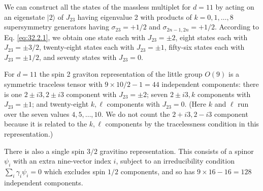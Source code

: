 We can construct all the states of the massless multiplet for \(d=11\)
by acting on an eigenstate \(\lvert2\rangle\) of \(J_{23}\) having
eigenvalue 2 with products of \(k=0,1,\ldots,8\) supersymmetry generators
having \(\sigma_{23}=+1/2\) and \(\sigma_{2n-1,2n}=+1/2\). According to
Eq. \eqref{eq:32.2.1}, we obtain one state each with \(J_{23}=\pm2\),
eight states each with \(J_{23}=\pm3/2\), twenty-eight states each with
\(J_{23}=\pm1\), fifty-six states each with \(J_{23}=\pm1/2\), and
seventy states with \(J_{23}=0\).

For \(d=11\) the spin 2 graviton representation of the little group
\(O(9)\) is a symmetric traceless tensor with
\(9\times10/2-1=44\) independent components: there is one
\(2\mathbin{\pm}i3,2\mathbin{\pm}i3\) component with
\(J_{23}=\pm2\); seven \(2\mathbin{\pm}i3,k\) components with
\(J_{23}=\pm1\); and twenty-eight \(k,\ell\) components with
\(J_{23}=0\). (Here \(k\) and \(\ell\) run over the seven values
\(4,5,\ldots,10\). We do not count the
\(2+i3,2-i3\) component because it is related to the \(k,\ell\)
components by the tracelessness condition in this representation.)

There is also a single spin \(3/2\) gravitino representation. This
consists of a spinor \(\psi_i\) with an extra nine-vector index \(i\),
subject to an irreducibility condition \(\sum_i\gamma_i\psi_i=0\) which
excludes spin \(1/2\) components, and so has
\(9\times16-16=128\) independent components.


